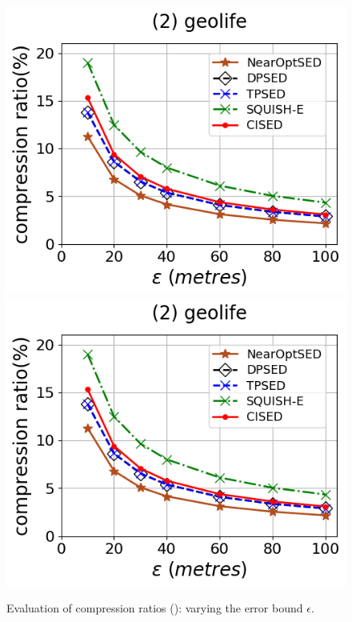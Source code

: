 \begin{figure}[tb!]
	\includegraphics[scale=0.315]{Figures/Exp-CR-epsilon-geolife.png}	\hspace{1ex}
	\includegraphics[scale=0.315]{Figures/Exp-CR-epsilon-geolife.png}
	\vspace{-2.5ex}
	\caption{\small Evaluation of compression ratios (\ped): varying the error bound $\epsilon$.}
	\label{fig:cr-ped}
	\vspace{-.5ex}
\end{figure}


